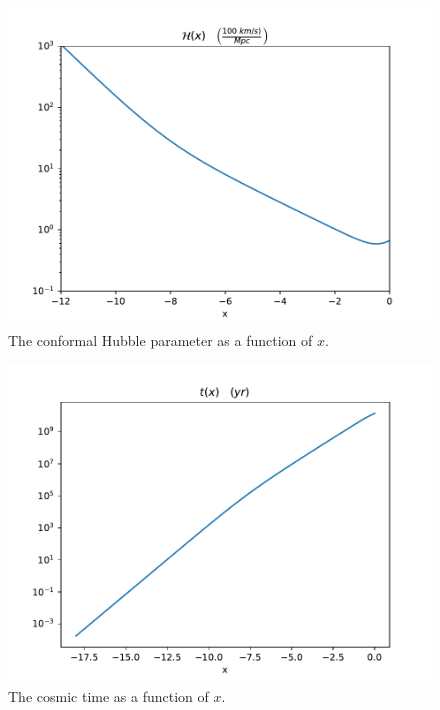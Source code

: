 \documentclass{aa}
\begin{document}



\begin{figure}[h!]
   \includegraphics[scale=0.6]{../figures/milestone1/Hp_x.pdf}
   \caption{The conformal Hubble parameter as a function of $x$.}\label{fig:M1_Hp}
\end{figure}

\begin{figure}[h!]
   \includegraphics[scale=0.6]{../figures/milestone1/t_x.pdf}
   \caption{The cosmic time as a function of $x$.}\label{fig:M1_t_x}
\end{figure}
\end{document}
